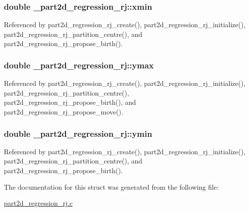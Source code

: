 \subsubsection[{\texorpdfstring{xmin}{xmin}}]{\setlength{\rightskip}{0pt plus 5cm}double \+\_\+part2d\+\_\+regression\+\_\+rj\+::xmin}\hypertarget{struct__part2d__regression__rj_a29ea39843b67dea844d76ec66bf90a50}{}\label{struct__part2d__regression__rj_a29ea39843b67dea844d76ec66bf90a50}


Referenced by part2d\+\_\+regression\+\_\+rj\+\_\+create(), part2d\+\_\+regression\+\_\+rj\+\_\+initialize(), part2d\+\_\+regression\+\_\+rj\+\_\+partition\+\_\+centre(), and part2d\+\_\+regression\+\_\+rj\+\_\+propose\+\_\+birth().

\subsubsection[{\texorpdfstring{ymax}{ymax}}]{\setlength{\rightskip}{0pt plus 5cm}double \+\_\+part2d\+\_\+regression\+\_\+rj\+::ymax}\hypertarget{struct__part2d__regression__rj_ac49ba4e67b0d272df1fce92fdf6c24ce}{}\label{struct__part2d__regression__rj_ac49ba4e67b0d272df1fce92fdf6c24ce}


Referenced by part2d\+\_\+regression\+\_\+rj\+\_\+create(), part2d\+\_\+regression\+\_\+rj\+\_\+initialize(), part2d\+\_\+regression\+\_\+rj\+\_\+partition\+\_\+centre(), part2d\+\_\+regression\+\_\+rj\+\_\+propose\+\_\+birth(), and part2d\+\_\+regression\+\_\+rj\+\_\+propose\+\_\+move().

\subsubsection[{\texorpdfstring{ymin}{ymin}}]{\setlength{\rightskip}{0pt plus 5cm}double \+\_\+part2d\+\_\+regression\+\_\+rj\+::ymin}\hypertarget{struct__part2d__regression__rj_a3044ffaca3e7edee55b4f6a5198d8ee8}{}\label{struct__part2d__regression__rj_a3044ffaca3e7edee55b4f6a5198d8ee8}


Referenced by part2d\+\_\+regression\+\_\+rj\+\_\+create(), part2d\+\_\+regression\+\_\+rj\+\_\+initialize(), part2d\+\_\+regression\+\_\+rj\+\_\+partition\+\_\+centre(), and part2d\+\_\+regression\+\_\+rj\+\_\+propose\+\_\+birth().



The documentation for this struct was generated from the following file\+:\begin{DoxyCompactItemize}
\item 
\hyperlink{part2d__regression__rj_8c}{part2d\+\_\+regression\+\_\+rj.\+c}\end{DoxyCompactItemize}
